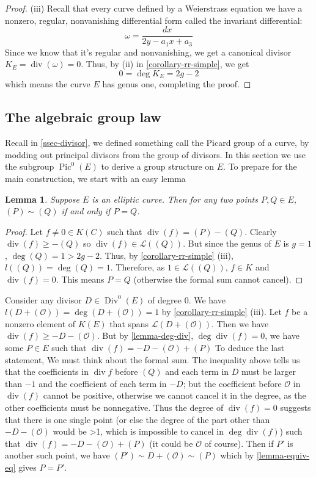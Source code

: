 \documentclass[12pt]{article}
\newtheorem{lemma}{Lemma}[subsection]
\theoremstyle{remark}
\theoremstyle{definition}
\newcommand{\w}[0]{\omega}
\newcommand{\Div}[0]{\operatorname{Div}}
\newcommand{\pdiv}[0]{\operatorname{div}}
\newcommand{\Pic}[0]{\operatorname{Pic}}
\begin{document}
\begin{proof}
                (iii) Recall that every curve defined by a Weierstrass equation we have a nonzero, regular, nonvanishing differential form called the invariant differential:
                \[\w=\frac{dx}{2y-a_1x+a_3}\]
                Since we know that it's regular and nonvanishing, we get a canonical divisor $K_E=\pdiv(\w)=0$. Thus, by (ii) in \autoref{corollary-rr-simple}, we get
                \[0=\deg K_E=2g-2\]
                which means the curve $E$ has genus one, completing the proof.
            \end{proof}
            
            
            
            
        \subsection{The algebraic group law}\label{ssec-alg-group}
            Recall in \autoref{ssec-divisor}, we defined something call the Picard group of a curve, by modding out principal divisors from the group of divisors. In this section we use the subgroup $\Pic^0(E)$ to derive a group structure on $E$. To prepare for the main construction, we start with an easy lemma
            \begin{lemma}\label{lemma-equiv-eq}
                Suppose $E$ is an elliptic curve. Then for any two points $P, Q\in E$, $(P)\sim (Q)$ if and only if $P=Q$.
            \end{lemma}
            \begin{proof}
                Let $f\neq 0\in K(C)$ such that $\pdiv(f)=(P)-(Q)$. Clearly $\pdiv(f)\geqslant -(Q)$ so $\pdiv(f)\in\mathcal L((Q))$. But since the genus of $E$ is $g=1$, $\deg (Q)=1>2g-2$. Thus, by \autoref{corollary-rr-simple} (iii), $l((Q))=\deg (Q)=1$. Therefore, as $1\in \mathcal L((Q))$, $f\in K$ and $\pdiv(f)=0$. This means $P=Q$ (otherwise the formal sum cannot cancel).
            \end{proof}
            Consider any divisor $D\in \Div^0(E)$ of degree $0$. We have $l(D+(\mathcal O))=\deg (D+(\mathcal O))=1$ by \autoref{corollary-rr-simple} (iii). Let $f$ be a nonzero element of $K(E)$ that spans $\mathcal L(D+(\mathcal O))$. Then we have $\pdiv(f)\geqslant -D-(\mathcal O)$. But by \autoref{lemma-deg-div}, $\deg\pdiv(f)=0$, we have some $P\in E$ such that $\pdiv(f)=-D-(\mathcal O)+(P)$ To deduce the last statement, We must think about the formal sum. The inequality above tells us that the coefficients in $\pdiv f$ before $(Q)$ and each term in $D$ must be larger than $-1$ and the coefficient of each term in $-D$; but the coefficient before $\mathcal O$ in $\pdiv(f)$ cannot be positive, otherwise we cannot cancel it in the degree, as the other coefficients must be nonnegative. Thus the degree of $\pdiv(f)=0$ suggests that there is one single point (or else the degree of the part other than $-D-(\mathcal O )$ would be >1, which is impossible to cancel in $\deg\pdiv(f)$) such that $\pdiv(f)=-D-(\mathcal O)+(P)$ (it could be $\mathcal O$ of course). Then if $P'$ is another such point, we have $(P')\sim D+(\mathcal O)\sim (P)$ which by \autoref{lemma-equiv-eq} gives $P=P'$.
            
\end{document}
